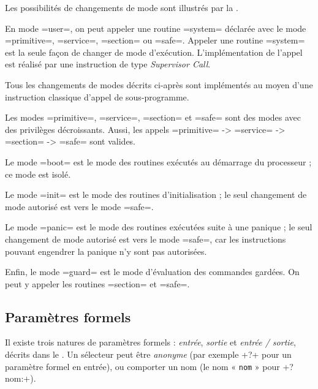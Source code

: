 Les possibilités de changements de mode sont illustrés par la .

En mode \plm=user=, on peut appeler une routine \plm=system= déclarée avec le mode \plm=primitive=, \plm=service=, \plm=section= ou \plm=safe=. Appeler une routine \plm=system= est la seule façon de changer de mode d'exécution. L'implémentation de l'appel est réalisé par une instruction de type \emph{Supervisor Call}.

Tous les changements de modes décrits ci-après sont implémentés au moyen d'une instruction classique d'appel de sous-programme.

Les modes \plm=primitive=, \plm=service=, \plm=section= et \plm=safe= sont des modes avec des privilèges décroissants. Aussi, les appels \plm=primitive= -> \plm=service= -> \plm=section= -> \plm=safe= sont valides.

Le mode \plm=boot= est le mode des routines exécutés au démarrage du processeur ; ce mode est isolé.

Le mode \plm=init= est le mode des routines d'initialisation ; le seul changement de mode autorisé est vers le mode \plm=safe=. 

Le mode \plm=panic= est le mode des routines exécutées suite à une panique ; le seul changement de mode autorisé est vers le mode \plm=safe=, car les instructions pouvant engendrer la panique n'y sont pas autorisées. 

Enfin, le mode \plm=guard= est le mode d'évaluation des commandes gardées. On peut y appeler les routines \plm=section= et \plm=safe=.












\subsection{Paramètres formels}

Il existe trois natures de paramètres formels : \emph{entrée}, \emph{sortie} et \emph{entrée / sortie}, décrits dans le . Un sélecteur peut être \emph{anonyme} (par exemple \plm+?+ pour un paramètre formel en entrée), ou comporter un nom (le nom « \texttt{nom} » pour \plm+?nom:+).

